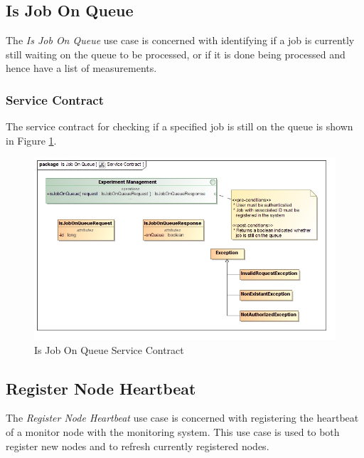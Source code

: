 \subsection {Is Job On Queue}
The \textit{Is Job On Queue} use case is concerned with identifying if a job is
currently still waiting on the queue to be processed, or if it is done being
processed and hence have a list of measurements.

\subsubsection{Service Contract}
The service contract for checking if a specified job is still on the queue is
shown in Figure \ref{fig:isJobOnQueueServiceContract}.
\begin{figure}[H]
  \begin{center}
  \includegraphics[scale=0.38]{../Diagrams and Charts/Experiment/Is Job On Queue Service Contract.jpg}
  \caption{Is Job On Queue Service Contract}
  \label{fig:isJobOnQueueServiceContract}
  \end{center}
\end{figure}



\subsection {Register Node Heartbeat}
The \textit{Register Node Heartbeat} use case is concerned with registering
the heartbeat of a monitor node with the monitoring system. This use case
is used to both register new nodes and to refresh currently registered nodes.

